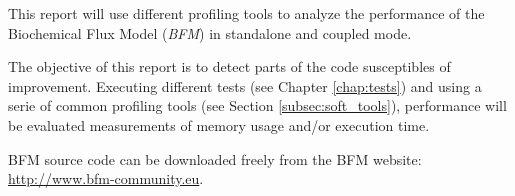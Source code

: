 
This report will use different profiling tools to analyze the performance of the Biochemical Flux Model ({\it BFM})\cite{bfm_2014} in standalone and coupled mode. 

The objective of this report is to detect parts of the code susceptibles of improvement. Executing different tests (see Chapter \ref{chap:tests}) and using a serie of 
common profiling tools (see Section \ref{subsec:soft_tools}), performance will be evaluated  measurements of memory usage and/or execution time.

BFM source code can be downloaded freely from the BFM website: \url{http://www.bfm-community.eu}.
